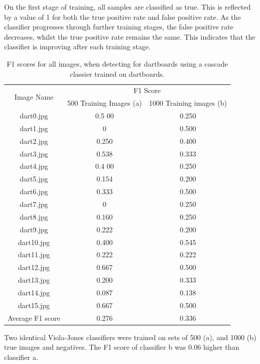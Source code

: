 \documentclass[conference]{IEEEtran}
\begin{document}
On the first stage of training, all samples are classified as true. This is reflected by a value of 1 for both the true positive rate and false positive rate. As the classifier progresses through further training stages, the false positive rate decreases, whilst the true positive rate remains the same. This indicates that the classifier is improving after each training stage. 
\par
\begin{table}[!htb]
\caption{F1 scores for all images, when detecting for dartboards using a cascade classier trained on dartboards.}
\begin{center}
\begin{tabular}{||c|c|c||}
\hline
\multirow{2}{*}{Image Name} & \multicolumn{2}{c||}{F1 Score}                \\ 
                                 & 500 Training Images (a)	& 1000 Training images (b) \\ \hline
dart0.jpg			& 0.5	00	&	0.250	\\
dart1.jpg			& 0		&	0.500	\\
dart2.jpg			& 0.250	&	0.400	\\
dart3.jpg			& 0.538	&	0.333	\\
dart4.jpg			& 0.4	00	&	0.250	\\
dart5.jpg			& 0.154	&	0.200	\\
dart6.jpg			& 0.333	&	0.500	\\
dart7.jpg			& 0		&	0.250	\\
dart8.jpg			& 0.160	&	0.250	\\
dart9.jpg			& 0.222	&	0.200	\\
dart10.jpg			& 0.400	&	0.545	\\
dart11.jpg			& 0.222	&	0.222	\\
dart12.jpg			& 0.667	&	0.500	\\
dart13.jpg			& 0.200	&	0.333	\\
dart14.jpg			& 0.087	&	0.138	\\
dart15.jpg			& 0.667	&	0.500	\\ \hline
Average F1 score 	& 0.276	&	0.336	\\ \hline
\end{tabular}
\end{center}
\label{default}
\end{table}%
Two identical Viola-Jones classifiers were trained on sets of 500 (a), and 1000 (b) true images and negatives. The F1 score of classifier b was 0.06 higher than classifier a. 
\end{document}
